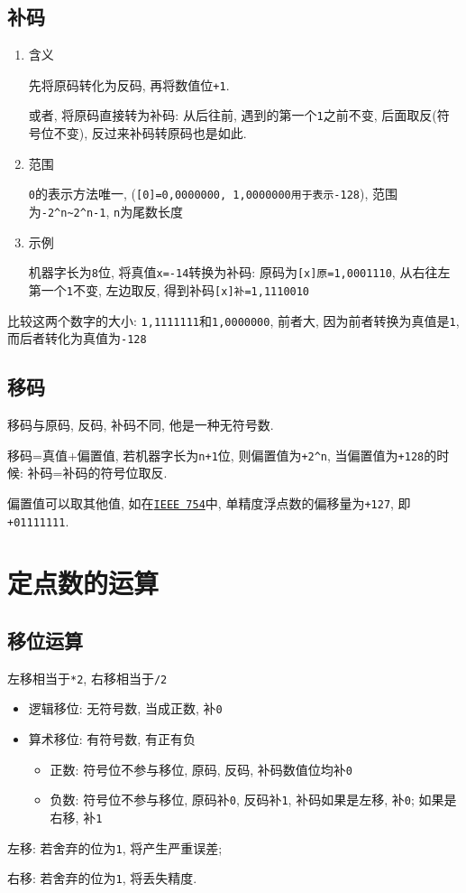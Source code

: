 \subsection{补码}
\begin{enumerate}
\item 含义 \par
先将原码转化为反码, 再将数值位\verb|+1|. \par 或者, 将原码直接转为补码: 从后往前, 遇到的第一个\verb|1|之前不变, 后面取反(符号位不变), 反过来补码转原码也是如此.
\item 范围 \par
\verb|0|的表示方法唯一, (\verb|[0]=0,0000000, 1,0000000用于表示-128|), 范围为\verb|-2^n~2^n-1|, \verb|n|为尾数长度
\item 示例 \par
机器字长为\verb|8|位, 将真值\verb|x=-14|转换为补码: 原码为\verb|[x]原=1,0001110|, 从右往左第一个\verb|1|不变, 左边取反, 得到补码\verb|[x]补=1,1110010|
\end{enumerate} \par 比较这两个数字的大小: \verb|1,1111111|和\verb|1,0000000|, 前者大, 因为前者转换为真值是\verb|1|, 而后者转化为真值为\verb|-128|
\subsection{移码}\label{移码}
移码与原码, 反码, 补码不同, 他是一种无符号数. \par 移码=真值+偏置值, 若机器字长为\verb|n+1|位, 则偏置值为\verb|+2^n|, 当偏置值为\verb|+128|的时候: 补码=补码的符号位取反. \par
偏置值可以取其他值, 如在\hyperref[IEEE 754]{\texttt{IEEE 754}}中, 单精度浮点数的偏移量为\verb|+127|, 即\verb|+01111111|.
\section{定点数的运算}
\subsection{移位运算} %
左移相当于\verb|*2|, 右移相当于\verb|/2|
\begin{itemize}
\item 逻辑移位: 无符号数, 当成正数, 补\verb|0|
\item 算术移位: 有符号数, 有正有负
\begin{itemize}
\item 正数: 符号位不参与移位, 原码, 反码, 补码数值位均补\verb|0|
\item 负数: 符号位不参与移位, 原码补\verb|0|, 反码补\verb|1|, 补码如果是左移, 补\verb|0|; 如果是右移, 补\verb|1|
\end{itemize}
\end{itemize} \par
左移: 若舍弃的位为\verb|1|, 将产生严重误差; \par 右移: 若舍弃的位为\verb|1|, 将丢失精度.
